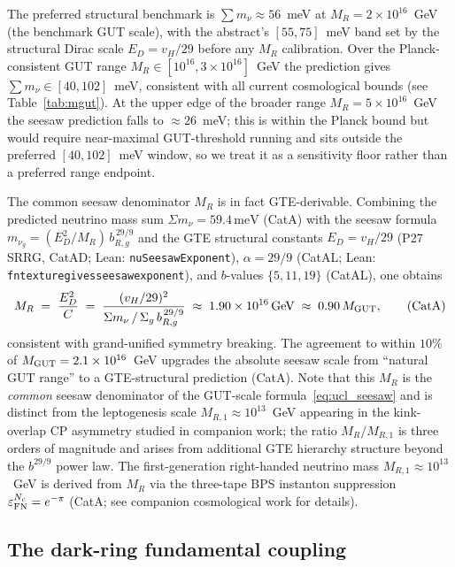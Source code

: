 \documentclass[12pt,a4paper]{article}
\theoremstyle{definition}
\theoremstyle{remark}
\newcommand{\lean}[1]{%
  \penalty-100
  \begingroup\def\_{\textunderscore\allowbreak}\texttt{#1}\endgroup}
\begin{document}
The preferred structural benchmark is $\sum m_\nu \approx 56$~meV
at $M_R = 2\times 10^{16}$~GeV (the benchmark GUT scale), with
the abstract's $[55, 75]$~meV band set by the structural Dirac scale
$E_D = v_H/29$ before any $M_R$ calibration.
Over the Planck-consistent GUT range
$M_R \in [10^{16}, 3\times 10^{16}]$~GeV the prediction gives
$\sum m_\nu \in [40, 102]$~meV, consistent with all current cosmological
bounds (see Table~\ref{tab:mgut}).
At the upper edge of the broader range
$M_R = 5\times 10^{16}$~GeV the seesaw prediction falls to
$\approx 26$~meV; this is within the Planck bound but would require
near-maximal GUT-threshold running and sits outside the preferred
$[40, 102]$~meV window, so we treat it as a sensitivity floor rather
than a preferred range endpoint.

The common seesaw denominator $M_R$ is in fact GTE-derivable.
Combining the predicted neutrino mass sum $\Sigma m_\nu = 59.4\,\text{meV}$
(CatA) with the seesaw formula $m_{\nu_g} = (E_D^2/M_R)\,b_{R,g}^{\,29/9}$
and the GTE structural constants $E_D = v_H/29$ (P27 SRRG, CatAD;
Lean: \lean{nuSeesawExponent}),
$\alpha = 29/9$ (CatAL; Lean: \lean{fn\_texture\_gives\_seesaw\_exponent}),
and $b$-values $\{5,11,19\}$ (CatAL), one obtains
\begin{equation}
  M_R \;=\; \frac{E_D^2}{C} \;=\; \frac{(v_H/29)^2}{\Sigma m_\nu\,/\,\Sigma_g\,b_{R,g}^{\,29/9}}
  \;\approx\; 1.90\times 10^{16}\,\text{GeV}
  \;\approx\; 0.90\,M_{\rm GUT}, \qquad \text{(CatA)}
  \label{eq:MR_gte}
\end{equation}
consistent with grand-unified symmetry breaking.
The agreement to within $10\%$ of $M_{\rm GUT} = 2.1\times 10^{16}$~GeV
upgrades the absolute seesaw scale from ``natural GUT range'' to a
GTE-structural prediction (CatA).
Note that this $M_R$ is the \emph{common} seesaw denominator of the
GUT-scale formula~\eqref{eq:ucl_seesaw} and is distinct from the
leptogenesis scale $M_{R,1}\approx 10^{13}$~GeV appearing in the
kink-overlap CP asymmetry studied in companion work; the ratio
$M_R/M_{R,1}$ is three orders of magnitude and arises from additional
GTE hierarchy structure beyond the $b^{29/9}$ power law.
The first-generation right-handed neutrino mass $M_{R,1} \approx 10^{13}$~GeV
is derived from $M_R$ via the three-tape BPS instanton suppression
$\varepsilon_{\rm FN}^{N_c} = e^{-\pi}$ (CatA; see companion cosmological work for details).

\subsection{The dark-ring fundamental coupling}
\label{subsec:dark_ring_coupling}
\end{document}
